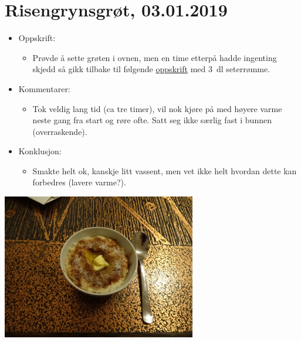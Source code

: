 \documentclass[12pt]{article}
\begin{document}
\section*{Risengrynsgr{\o}t, 03.01.2019}
\begin{itemize}
\item Oppskrift:
  \begin{itemize}
  \item Pr{\o}vde {\aa} sette gr{\o}ten i ovnen, men en time etterp{\aa} hadde
    ingenting skjedd s{\aa} gikk tilbake til f{\o}lgende
    \href{https://www.melk.no/Oppskrifter/Groeter/Tradisjonsgroet/Risengrynsgroet}{oppskrift}
    med 3~dl seterr{\o}mme.
  \end{itemize}
\item Kommentarer:
  \begin{itemize}
    \item Tok veldig lang tid (ca tre timer), vil nok kj{\o}re p{\aa} med
      h{\o}yere varme neste gang fra start og r{\o}re ofte. Satt seg ikke
      s{\ae}rlig fast i bunnen (overraskende).
  \end{itemize}
\item Konklusjon:
  \begin{itemize}
  \item Smakte helt ok, kanskje litt vassent, men vet ikke helt hvordan dette kan forbedres (lavere varme?). 
  \end{itemize}
\end{itemize}
\centering
\includegraphics[width=3.33in]{03-01-2019.png}
\end{document}
